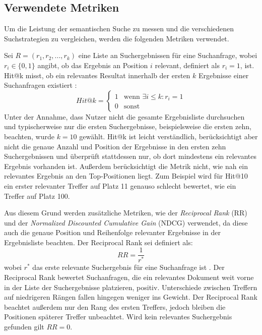 \documentclass[12pt,letterpaper]{article} %
\begin{document}

\subsection{Verwendete Metriken}
\label{sec:verwendete_metriken}

Um die Leistung der semantischen Suche zu messen und die verschiedenen Suchstrategien zu vergleichen, werden die folgenden Metriken verwendet.

Sei $R = (r_1, r_2, ..., r_k)$ eine Liste an Suchergebnissen für eine Suchanfrage, wobei $r_i \in \{0, 1\}$ angibt, ob das Ergebnis an Position $i$ relevant, definiert als $r_i = 1$, ist. Hit@k misst, ob ein relevantes Resultat innerhalb der ersten $k$ Ergebnisse einer Suchanfragen existiert \citep[S. 6, 15]{min_unihgkr_2025}:
$$Hit@k =
\begin{cases}
1 & \text{wenn } \exists i \leq k: r_i = 1 \\
0 & \text{sonst}
\end{cases}$$
Unter der Annahme, dass Nutzer nicht die gesamte Ergebnisliste durchsuchen und typischerweise nur die ersten Suchergebnisse, beispielsweise die ersten zehn, beachten, wurde $k = 10$ gewählt.
Hit@k ist leicht verständlich, berücksichtigt aber nicht die genaue Anzahl und Position der Ergebnisse in den ersten zehn Suchergebnissen und überprüft stattdessen nur, ob dort mindestens ein relevantes Ergebnis vorhanden ist.
Außerdem berücksichtigt die Metrik nicht, wie nah ein relevantes Ergebnis an den Top-Positionen liegt.
Zum Beispiel wird für Hit@10 ein erster relevanter Treffer auf Platz 11 genauso schlecht bewertet, wie ein Treffer auf Platz 100.

Aus diesem Grund werden zusätzliche Metriken, wie der \textit{Reciprocal Rank} (RR) und der \textit{Normalized Discounted Cumulative Gain} (NDCG) verwendet, da diese auch die genaue Position und Reihenfolge relevanter Ergebnisse in der Ergebnisliste beachten.
Der Reciprocal Rank sei definiert als:
$$RR = \frac{1}{r^*}$$
wobei $r^*$ das erste relevante Suchergebnis für eine Suchanfrage ist \citep[S. 6]{brama_evaluation_2023}.
Der Reciprocal Rank bewertet Suchanfragen, die ein relevantes Dokument weit vorne in der Liste der Suchergebnisse platzieren, positiv.
Unterschiede zwischen Treffern auf niedrigeren Rängen fallen hingegen weniger ins Gewicht.
Der Reciprocal Rank beachtet außerdem nur den Rang des ersten Treffers, jedoch bleiben die Positionen späterer Treffer unbeachtet.
Wird kein relevantes Suchergebnis gefunden gilt $RR = 0$.
\end{document}
